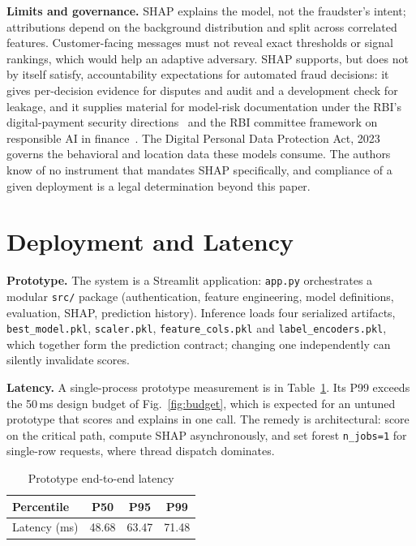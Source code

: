 \documentclass[conference]{IEEEtran}
\newcommand{\tabfont}{\footnotesize}
\begin{document}
\textbf{Limits and governance.} SHAP explains the model, not the fraudster's intent; attributions depend on the background distribution and split across correlated features. Customer-facing messages must not reveal exact thresholds or signal rankings, which would help an adaptive adversary. SHAP supports, but does not by itself satisfy, accountability expectations for automated fraud decisions: it gives per-decision evidence for disputes and audit and a development check for leakage, and it supplies material for model-risk documentation under the RBI's digital-payment security directions~\cite{rbi21} and the RBI committee framework on responsible AI in finance~\cite{rbifree25}. The Digital Personal Data Protection Act, 2023~\cite{dpdp23} governs the behavioral and location data these models consume. The authors know of no instrument that mandates SHAP specifically, and compliance of a given deployment is a legal determination beyond this paper.

\section{Deployment and Latency}
\textbf{Prototype.} The system is a Streamlit application: \texttt{app.py} orchestrates a modular \texttt{src/} package (authentication, feature engineering, model definitions, evaluation, SHAP, prediction history). Inference loads four serialized artifacts, \texttt{best\_\allowbreak{}model.pkl}, \texttt{scaler.pkl}, \texttt{feature\_\allowbreak{}cols.pkl} and \texttt{label\_\allowbreak{}encoders.pkl}, which together form the prediction contract; changing one independently can silently invalidate scores.

\textbf{Latency.} A single-process prototype measurement is in Table~\ref{tab:lat}. Its P99 exceeds the 50\,ms design budget of Fig.~\ref{fig:budget}, which is expected for an untuned prototype that scores and explains in one call. The remedy is architectural: score on the critical path, compute SHAP asynchronously, and set forest \texttt{n\_\allowbreak{}jobs=1} for single-row requests, where thread dispatch dominates.

\begin{table}[!t]
\caption{Prototype end-to-end latency}\label{tab:lat}
\centering\tabfont
\begin{tabular}{@{}lccc@{}}
\toprule
\textbf{Percentile} & \textbf{P50} & \textbf{P95} & \textbf{P99}\\
\midrule
Latency (ms) & 48.68 & 63.47 & 71.48\\
\bottomrule
\end{tabular}
\end{table}
\end{document}
